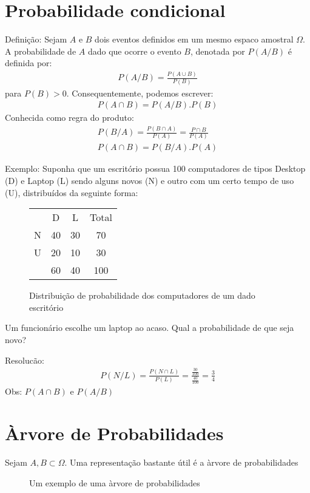\documentclass[11pt,a4paper]{article}
\begin{document}
\section{Probabilidade condicional}
Definição: Sejam $A$ e $B$ dois eventos definidos em um mesmo espaco amostral $\Omega$.
A probabilidade de $A$  dado que ocorre o evento $B$, denotada por $P(A/B)$ é definida por:
\begin{align}
  P(A/B)= \frac{P(A\cup B)}{P(B)}
\end{align}
para $P(B)>0$. Consequentemente, podemos escrever:
\begin{align}
  P(A\cap B)= P(A/B).P(B)
\end{align}
Conhecida como regra do produto:
\begin{align}
  P(B/A)= \frac{P(B \cap A)}{P(A)}= \frac{P\cap B}{P(A)}\\
  P(A \cap B)= P(B/A).P(A)
\end{align}

Exemplo: Suponha que um escritório possua 100 computadores de tipos Desktop (D) e 
Laptop (L) sendo alguns novos (N) e outro com um certo tempo de uso (U), distribuídos da seguinte forma:
\begin{figure} 
  \centering
  \begin{tabular}{c c c c}
    \toprule
    &D&L&Total\\ \cmidrule{2-4}
    N&40&30&70\\ \cmidrule{2-4}
    U&20&10&30\\ \cmidrule{2-4}
    &60&40&100 \\\bottomrule
  \end{tabular}
  \label{fig:1}
  \caption{Distribuição de probabilidade dos computadores de um dado escritório}
\end{figure}
Um funcionário escolhe um laptop ao acaso. Qual a probabilidade de que seja novo?

Resolucão: 
\begin{align}
  P(N/L)= \frac{P(N \cap L)}{P(L)}= \frac{\frac{30}{100}}{\frac{40}{100}}=\frac{3}{4}
\end{align}
Obs: $P(A \cap B)$ e $P(A/B)$

\section{Àrvore de Probabilidades}
Sejam $A,B \subset \Omega$. Uma representação bastante útil é a àrvore de probabilidades
\begin{figure}
  \label{fig:2}
  \caption{Um exemplo de uma àrvore de probabilidades}
\end{figure}
\end{document}
